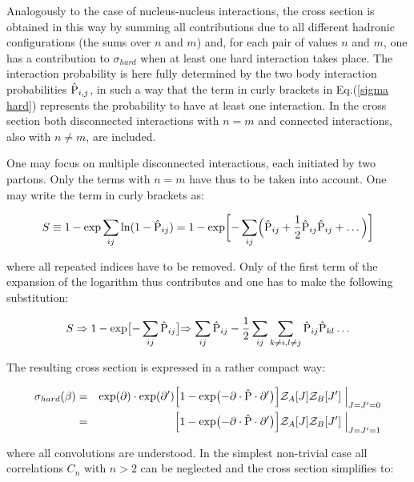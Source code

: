 \documentclass{ws-rv9x6}
\begin{document}
\noindent Analogously to the case of nucleus-nucleus interactions\cite{Bialas:1976ed}, the cross section is
obtained in this way by summing all contributions due to all different
hadronic configurations (the sums over $n$ and $m$) and, for each pair
of values $n$ and $m$, one has a contribution to $\sigma_{hard}$
when at least one hard interaction takes place. The interaction probability is here fully determined by the two body interaction probabilities $\hat{\rm P}_{i,j}$, in such a way that the term in curly brackets in Eq.(\ref{sigma hard}) represents the probability to have at least one interaction.
\noindent In the cross section both disconnected
interactions with $n=m$ and connected interactions, also with $n\neq m$, are included.

\noindent One may focus on multiple disconnected interactions, each initiated by two partons. Only the terms with $n=m$ have thus to be taken into account. One may write the term in curly brackets as:

\begin{eqnarray}S\equiv 1-{\rm exp}\sum_{ij}{\rm ln}(1-\hat{\rm P}_{ij})
=1-{\rm exp}\biggl[-\sum_{ij}\Bigl(\hat{\rm P}_{ij}+{1\over
2}\hat{\rm P}_{ij}\hat{\rm P}_{ij} +\dots\Bigr)\biggr]\end{eqnarray}

\noindent where all repeated indices have to be removed. Only of the first term of the expansion of the logarithm thus contributes and one has to make the following substitution:

\begin{eqnarray}S\Rightarrow 1-{\rm exp}\bigl[-\sum_{ij}\hat{\rm P}_{ij}\bigl]\Rightarrow
  \sum_{ij}\hat{\rm P}_{ij}-{1\over 2}
  \sum_{ij}\sum_{k\not=i,l\not=j}\hat{\rm P}_{ij}\hat{\rm P}_{kl}
  \dots\end{eqnarray}

\noindent The resulting cross section is expressed in a rather compact way:

\begin{eqnarray}\label{compact}\sigma_{hard}(\beta)&=&{\rm exp}(\partial)\cdot {\rm exp}(\partial')
  \Bigl[ 1-{\rm exp}\bigl(-\partial\cdot\hat{\rm P}\cdot\partial'\bigr)\Bigr]
  {\cal Z}_A[J]{\cal Z}_B[J']\Bigm|_{J=J'=0}\cr
  &=&\Bigl[ 1-{\rm exp}\bigl(-\partial\cdot\hat{\rm P}\cdot\partial'\bigr)\Bigr]
  {\cal Z}_A[J]{\cal Z}_B[J']\Bigm|_{J=J'=1}\end{eqnarray}

\noindent where all convolutions are understood. In the simplest non-trivial case all correlations
$C_n$ with $n>2$ can be neglected and the cross section simplifies to:
\end{document}
